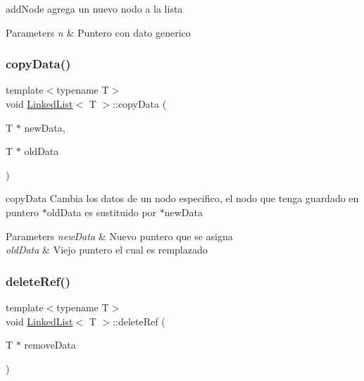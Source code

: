 add\+Node agrega un nuevo nodo a la lista 


\begin{DoxyParams}{Parameters}
{\em n} & Puntero con dato generico \\
\hline
\end{DoxyParams}
\mbox{\label{class_linked_list_a97f549fc2d43b889127273012fbfe7fa}} 
\subsubsection{\texorpdfstring{copy\+Data()}{copyData()}}
{\footnotesize\ttfamily template$<$typename T$>$ \\
void \hyperlink{class_linked_list}{Linked\+List}$<$ T $>$\+::copy\+Data (\begin{DoxyParamCaption}\item[{T $\ast$}]{new\+Data,  }\item[{T $\ast$}]{old\+Data }\end{DoxyParamCaption})}



copy\+Data Cambia los datos de un nodo especifico, el nodo que tenga guardado en puntero $\ast$old\+Data es sustituido por $\ast$new\+Data 


\begin{DoxyParams}{Parameters}
{\em new\+Data} & Nuevo puntero que se asigna \\
\hline
{\em old\+Data} & Viejo puntero el cual es remplazado \\
\hline
\end{DoxyParams}
\mbox{\label{class_linked_list_aa533ed600752a31abb17b0482e7c10c9}} 
\subsubsection{\texorpdfstring{delete\+Ref()}{deleteRef()}}
{\footnotesize\ttfamily template$<$typename T$>$ \\
void \hyperlink{class_linked_list}{Linked\+List}$<$ T $>$\+::delete\+Ref (\begin{DoxyParamCaption}\item[{T $\ast$}]{remove\+Data }\end{DoxyParamCaption})}




